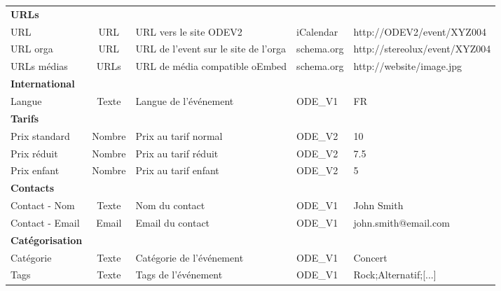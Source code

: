 \begin{table}[h]
\begin{adjustwidth}{-1.8cm}{}
\begin{tabular}{|l || c | l | l | l |}
\hline

{\bf URLs} &  &  &  &  \\

URL & URL & URL vers le site ODEV2 & iCalendar & http://ODEV2/event/XYZ004 \\
URL orga & URL & URL de l'event sur le site de l'orga & schema.org & http://stereolux/event/XYZ004 \\
URLs médias & URLs & URL de média compatible oEmbed & schema.org & http://website/image.jpg \\

\hline

{\bf International} &  &  &  &  \\

Langue & Texte & Langue de l'événement & ODE\_V1 & FR \\

\hline

{\bf Tarifs} &  &  &  &  \\

Prix standard & Nombre & Prix au tarif normal & ODE\_V2 & 10 \\
Prix réduit & Nombre & Prix au tarif réduit & ODE\_V2 & 7.5 \\
Prix enfant & Nombre & Prix au tarif enfant & ODE\_V2 & 5 \\

\hline

{\bf Contacts} & &  &  &  \\

Contact - Nom & Texte & Nom du contact & ODE\_V1 & John Smith \\
Contact - Email & Email & Email du contact & ODE\_V1 & john.smith@email.com \\

\hline

{\bf Catégorisation} & &  &  &  \\

Catégorie & Texte & Catégorie de l'événement & ODE\_V1 & Concert \\
Tags & Texte & Tags de l'événement & ODE\_V1 & Rock;Alternatif;{[}...{]} \\

\hline

\end{tabular}
\end{adjustwidth}
\end{table}
